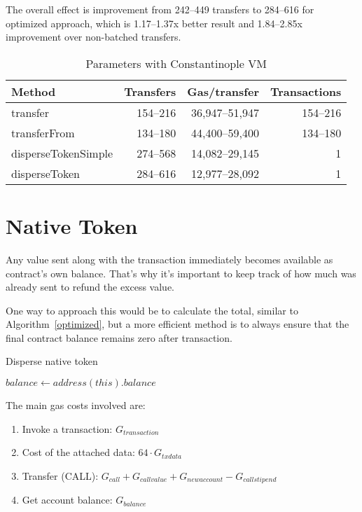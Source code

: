 \documentclass[12pt]{article}
\begin{document}
The overall effect is improvement from 242--449 transfers to 284--616 for optimized approach, which is 1.17--1.37x better result and 1.84--2.85x improvement over non-batched transfers.

\begin{table}[h]
\caption{Parameters with Constantinople VM}
\label{table-constantinople}
\begin{center}
\begin{tabular}{lrrr}
Method              & Transfers & Gas/transfer   & Transactions \\ \midrule
transfer            & 154--216  & 36,947--51,947 & 154--216     \\
transferFrom        & 134--180  & 44,400--59,400 & 134--180     \\
disperseTokenSimple & 274--568  & 14,082--29,145 & 1            \\
disperseToken       & 284--616  & 12,977--28,092 & 1           
\end{tabular}
\end{center}
\end{table}


\newpage
\section{Native Token}

Any value sent along with the transaction immediately becomes available as contract's own balance.
That's why it's important to keep track of how much was already sent to refund the excess value.

One way to approach this would be to calculate the total, similar to Algorithm~\ref{optimized}, but a more efficient method is to always ensure that the final contract balance remains zero after transaction.

\begin{algorithm}[h]
	\label{native}
	\caption{Disperse native token}
	\BlankLine
	\For{$i \in [0 \dots recipients.length)$}{
		recipients[i].transfer(values[i])
	}
	$balance \leftarrow address(this).balance$ \\
\end{algorithm}

The main gas costs involved are:
\begin{enumerate}
	\item Invoke a transaction: $G_{transaction}$
	\item Cost of the attached data: $64 \cdot G_{txdata}$
	\item Transfer (CALL): $G_{call} + G_{callvalue} + G_{newaccount} - G_{callstipend}$
	\item Get account balance: $G_{balance}$
\end{enumerate}
\end{document}

